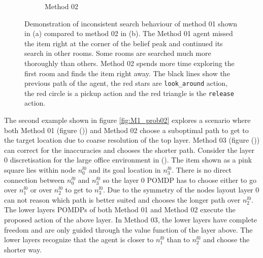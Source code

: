 \begin{figure}
\begin{subfigure}[b]{0.49\textwidth}
        \caption{Method 02}
        \label{subfig:problem1_M2}
    \end{subfigure}
    \caption{Demonstration of inconsistent search behaviour of method 01 shown in (a) compared to method 02 in (b). The Method 01 agent missed the item right at the corner of the belief peak and continued its search in other rooms. Some rooms are searched much more thoroughly than others. Method 02 spends more time exploring the first room and finds the item right away. The black lines show the previous path of the agent, the red stars are \texttt{look\_around} action, the red circle is a pickup action and the red triangle is the \texttt{release} action.}
    \label{fig:M1_prob01}
\end{figure}

The second example shown in figure \ref{fig:M1_prob02} explores a scenario where both Method 01 (figure ()) and Method 02 choose a suboptimal path to get to the target location due to coarse resolution of the top layer. Method 03 (figure ()) can correct for the inaccuracies and chooses the shorter path. Consider the layer 0 discretisation for the large office environment in (). The item shown as a pink square lies within node $n_0^{l0}$ and its goal location in $n_3^{l0}$. There is no direct connection between $n_0^{l0}$ and $n_3^{l0}$ so the layer 0 POMDP has to choose either to go over $n_1^{l0}$ or over $n_2^{l0}$ to get to $n_3^{l0}$. Due to the symmetry of the nodes layout layer 0 can not reason which path is better suited and chooses the longer path over $n_2^{l0}$. The lower layers POMDPs of both Method 01 and Method 02 execute the proposed action of the above layer. In Method 03, the lower layers have complete freedom and are only guided through the value function of the layer above. The lower layers recognize that the agent is closer to $n_1^{l0}$ than to $n_2^{l0}$ and choose the shorter way.


